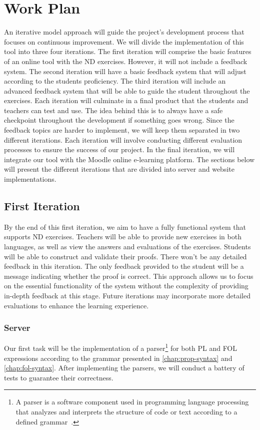 \section{Work Plan}
An iterative model approach will guide the project's development process that focuses on continuous improvement. We will divide the implementation of this tool into three four iterations. The first iteration will comprise the basic features of an online tool with the \gls{ND} exercises. However, it will not include a feedback system. The second iteration will have a basic feedback system that will adjust according to the students proficiency. The third iteration will include an advanced feedback system that will be able to guide the student throughout the exercises. Each iteration will culminate in a final product that the students and teachers can test and use. The idea behind this is to always have a safe checkpoint throughout the development if something goes wrong. Since the feedback topics are harder to implement, we will keep them separated in two different iterations. Each iteration will involve conducting different evaluation processes to ensure the success of our project. In the final iteration, we will integrate our tool with the Moodle online e-learning platform. The sections below will present the different iterations that are divided into server and website implementations.

\subsection{First Iteration}
By the end of this first iteration, we aim to have a fully functional system that supports \gls{ND} exercises. Teachers will be able to provide new exercises in both languages, as well as view the answers and evaluations of the exercises. Students will be able to construct and validate their proofs. There won't be any detailed feedback in this iteration. The only feedback provided to the student will be a message indicating whether the proof is correct. This approach allows us to focus on the essential functionality of the system without the complexity of providing in-depth feedback at this stage. Future iterations may incorporate more detailed evaluations to enhance the learning experience.

\subsubsection{Server}
Our first task will be the implementation of a parser\footnote{A parser is a software component used in programming language processing that analyzes and interprets the structure of code or text according to a defined grammar~\cite{afroozeh_2015_one}.} for both \gls{PL} and \gls{FOL} expressions according to the grammar presented in \ref{chap:prop-syntax} and \ref{chap:fol-syntax}. After implementing the parsers, we will conduct a battery of tests to guarantee their correctness. 


